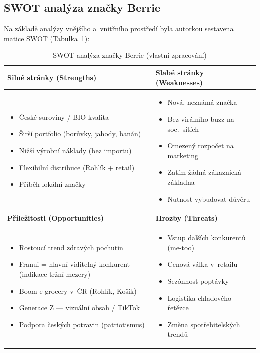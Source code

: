 \subsection{SWOT analýza značky Berrie}

Na základě analýzy vnějšího a~vnitřního prostředí byla autorkou sestavena matice SWOT (Tabulka~\ref{tab:swot}):

\begin{table}[H]
\centering
\caption{SWOT analýza značky Berrie (vlastní zpracování)}
\label{tab:swot}
\begin{tabularx}{\textwidth}{|X|X|}
\hline
\textbf{Silné stránky (Strengths)} & \textbf{Slabé stránky (Weaknesses)} \\
\hline
\begin{itemize}[nosep,leftmargin=*]
  \item České suroviny / BIO kvalita
  \item Širší portfolio (borůvky, jahody, banán)
  \item Nižší výrobní náklady (bez importu)
  \item Flexibilní distribuce (Rohlík + retail)
  \item Příběh lokální značky
\end{itemize}
&
\begin{itemize}[nosep,leftmargin=*]
  \item Nová, neznámá značka
  \item Bez virálního buzz na soc.\ sítích
  \item Omezený rozpočet na marketing
  \item Zatím žádná zákaznická základna
  \item Nutnost vybudovat důvěru
\end{itemize}
\\
\hline
\textbf{Příležitosti (Opportunities)} & \textbf{Hrozby (Threats)} \\
\hline
\begin{itemize}[nosep,leftmargin=*]
  \item Rostoucí trend zdravých pochutin
  \item Franui = hlavní viditelný konkurent (indikace tržní mezery)
  \item Boom e-grocery v~ČR (Rohlík, Košík)
  \item Generace Z — vizuální obsah / TikTok
  \item Podpora českých potravin (patriotismus)
\end{itemize}
&
\begin{itemize}[nosep,leftmargin=*]
  \item Vstup dalších konkurentů (me-too)
  \item Cenová válka v~retailu
  \item Sezónnost poptávky
  \item Logistika chladového řetězce
  \item Změna spotřebitelských trendů
\end{itemize}
\\
\hline
\end{tabularx}
\end{table}

